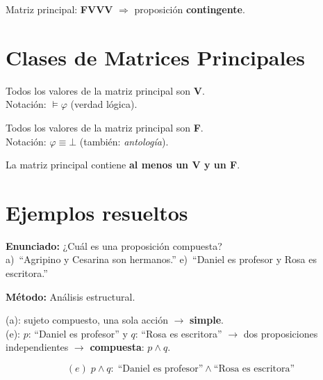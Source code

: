 	\noindent Matriz principal: \textbf{FVVV} $\Rightarrow$ proposición
	\textbf{contingente}.
	
	\section{Clases de Matrices Principales}
	
	\begin{cajaprop}[Tautología]
		Todos los valores de la matriz principal son \textbf{V}.\\
		Notación: $\models \varphi$ \quad (verdad lógica).
	\end{cajaprop}
	
	\begin{cajaprop}[Contradicción]
		Todos los valores de la matriz principal son \textbf{F}.\\
		Notación: $\varphi \equiv \bot$ \quad (también: \textit{antología}).
	\end{cajaprop}
	
	\begin{cajaprop}[Contingencia]
		La matriz principal contiene \textbf{al menos un V y un F}.
	\end{cajaprop}
	
	\section{Ejemplos resueltos}
	
	\begin{cajaejemplo}
		\textbf{Enunciado:} ¿Cuál es una proposición compuesta?\\[4pt]
		a)~``Agripino y Cesarina son hermanos.'' \quad
		e)~``Daniel es profesor y Rosa es escritora.''
		
		\medskip
		\noindent\textbf{Método:} Análisis estructural.
		
		\medskip
		\noindent (a): sujeto compuesto, una sola acción $\to$ \textbf{simple}.\\
		(e): $p$: ``Daniel es profesor'' y $q$: ``Rosa es escritora'' $\to$
		dos proposiciones independientes $\to$ \textbf{compuesta}: $p \wedge q$.
		
		\begin{tcolorbox}[colback=AzulClaro!50, colframe=AzulPizarra,
			arc=2pt, boxrule=0.7pt]
			\[\boxed{(e)\;p \wedge q:\;\text{``Daniel es profesor''}
				\wedge \text{``Rosa es escritora''}}\]
		\end{tcolorbox}
	\end{cajaejemplo}
	
